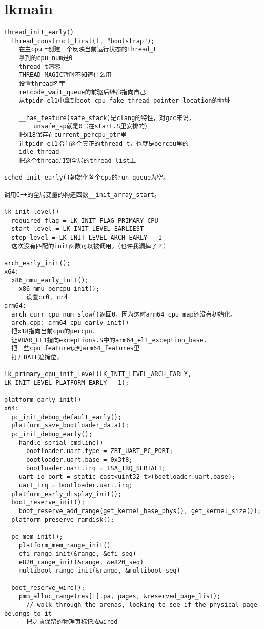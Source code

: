 \section{lkmain}
\begin{verbatim}
thread_init_early()
  thread_construct_first(t, "bootstrap");
    在主cpu上创建一个反映当前运行状态的thread_t
    拿到的cpu num是0
    thread_t清零
    THREAD_MAGIC暂时不知道什么用
    设置thread名字
    retcode_wait_queue的前驱后继都指向自己
    从tpidr_el1中拿到boot_cpu_fake_thread_pointer_location的地址

    __has_feature(safe_stack)是clang的特性，对gcc来说，
        unsafe_sp就是0（在start.S里安排的）
    把x18保存在current_percpu_ptr里
    让tpidr_el1指向这个真正的thread_t，也就是percpu里的
    idle_thread
    把这个thread加到全局的thread list上

sched_init_early()初始化各个cpu的run queue为空。

调用C++的全局变量的构造函数__init_array_start。

lk_init_level()
  required_flag = LK_INIT_FLAG_PRIMARY_CPU
  start_level = LK_INIT_LEVEL_EARLIEST
  stop_level = LK_INIT_LEVEL_ARCH_EARLY - 1
  这次没有匹配的init函数可以被调用。（也许我漏掉了？）

arch_early_init();
x64:
  x86_mmu_early_init();
    x86_mmu_percpu_init();
      设置cr0, cr4
arm64:
  arch_curr_cpu_num_slow()返回0，因为这时arm64_cpu_map还没有初始化。
  arch.cpp: arm64_cpu_early_init()
  把x18指向当前cpu的percpu.
  让VBAR_EL1指向exceptions.S中的arm64_el1_exception_base.
  把一些cpu feature读到arm64_features里
  打开DAIF遮掩位。

lk_primary_cpu_init_level(LK_INIT_LEVEL_ARCH_EARLY, LK_INIT_LEVEL_PLATFORM_EARLY - 1);

platform_early_init()
x64:
  pc_init_debug_default_early();
  platform_save_bootloader_data();
  pc_init_debug_early();
    handle_serial_cmdline()
      bootloader.uart.type = ZBI_UART_PC_PORT;
      bootloader.uart.base = 0x3f8;
      bootloader.uart.irq = ISA_IRQ_SERIAL1;
    uart_io_port = static_cast<uint32_t>(bootloader.uart.base);
    uart_irq = bootloader.uart.irq;
  platform_early_display_init();
  boot_reserve_init();
    boot_reserve_add_range(get_kernel_base_phys(), get_kernel_size());
  platform_preserve_ramdisk();

  pc_mem_init();
    platform_mem_range_init()
    efi_range_init(&range, &efi_seq)
    e820_range_init(&range, &e820_seq)
    multiboot_range_init(&range, &multiboot_seq)

  boot_reserve_wire();
    pmm_alloc_range(res[i].pa, pages, &reserved_page_list);
      // walk through the arenas, looking to see if the physical page belongs to it
      把之前保留的物理页标记成wired


\end{verbatim}
